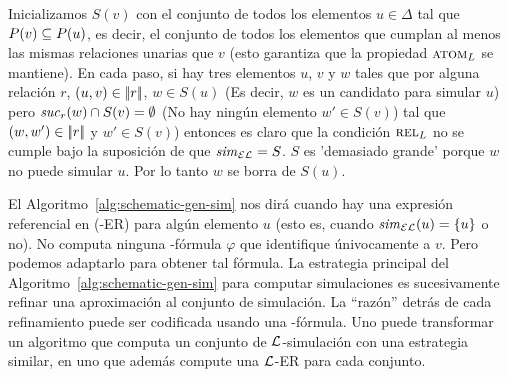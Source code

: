 
%


Inicializamos $S(v)$ con
el conjunto de todos los elementos $u\in\Delta$ tal que $P(v)\subseteq
P(u)$, es decir, el conjunto de todos los elementos que cumplan al menos las
mismas relaciones unarias que $v$ (esto garantiza que la propiedad $\textsc{atom}_L$ se mantiene).
En cada paso, si hay tres elementos $u$, $v$ y $w$ tales que
por alguna relaci\'on $r$, $(u,v) \in |\!|r|\!|$, $w\in S(u)$
(Es decir, $w$ es un candidato para simular $u$) pero ${\it suc}_{r}(w)\cap S(v) = \emptyset$
(No hay ning\'un elemento $w'\in S(v)$) tal que $(w, w') \in |\!|r|\!|$
y $w'\in S(v)$) entonces es claro que la condici\'on $\textsc{rel}_L$ no se cumple
bajo la suposici\'on de que ${\it sim}_\mathcal{EL}=S$. $S$ es 'demasiado grande' porque
$w$ no puede simular $u$. Por lo tanto $w$ se borra de $S(u)$.


El Algoritmo~\ref{alg:schematic-gen-sim} nos dir\'a cuando hay una expresi\'on referencial en \EL (\EL-ER) para alg\'un elemento $u$ (esto es, cuando
${\it sim}_{\mathcal{EL}}(u) = \{u\}$ o no). No computa ninguna \EL-f\'ormula $\varphi$ que identifique \'univocamente a $v$. Pero
podemos adaptarlo para obtener tal f\'ormula.
La estrategia principal del Algoritmo~\ref{alg:schematic-gen-sim} para computar simulaciones es sucesivamente refinar una aproximaci\'on al conjunto de simulaci\'on.
La ``raz\'on'' detr\'as de cada refinamiento puede ser codificada usando una \EL-f\'ormula.
Uno puede transformar un algoritmo que computa un conjunto de $\mathcal{L}$-simulaci\'on con una estrategia similar, en uno que adem\'as compute una $\mathcal{L}$-ER para cada conjunto.


